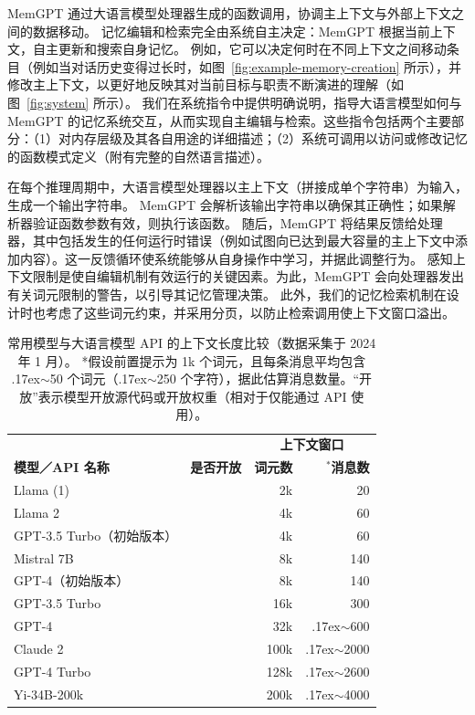 \documentclass[UTF8,fontset=fandol,a4paper,11pt]{ctexart}
\newcommand{\ours}{MemGPT\xspace}
\newcommand{\mytilde}{\raise.17ex\hbox{$\scriptstyle\mathtt{\sim}$}}
\newcommand{\green}[1]{\textcolor{ForestGreen}{#1}}
\newcommand{\red}[1]{\textcolor{red}{#1}}
\newcommand{\cmark}{\green{\ding{51}}}
\newcommand{\xmark}{\red{\ding{55}}}
\begin{document}
\ours 通过大语言模型处理器生成的函数调用，协调主上下文与外部上下文之间的数据移动。
记忆编辑和检索完全由系统自主决定：\ours 根据当前上下文，自主更新和搜索自身记忆。
例如，它可以决定何时在不同上下文之间移动条目（例如当对话历史变得过长时，如图~\ref{fig:example-memory-creation} 所示），并修改主上下文，以更好地反映其对当前目标与职责不断演进的理解（如图~\ref{fig:system} 所示）。
我们在系统指令中提供明确说明，指导大语言模型如何与 \ours 的记忆系统交互，从而实现自主编辑与检索。这些指令包括两个主要部分：（1）对内存层级及其各自用途的详细描述；（2）系统可调用以访问或修改记忆的函数模式定义（附有完整的自然语言描述）。

在每个推理周期中，大语言模型处理器以主上下文（拼接成单个字符串）为输入，生成一个输出字符串。
\ours 会解析该输出字符串以确保其正确性；如果解析器验证函数参数有效，则执行该函数。
随后，\ours 将结果反馈给处理器，其中包括发生的任何运行时错误（例如试图向已达到最大容量的主上下文中添加内容）。这一反馈循环使系统能够从自身操作中学习，并据此调整行为。
感知上下文限制是使自编辑机制有效运行的关键因素。为此，\ours 会向处理器发出有关词元限制的警告，以引导其记忆管理决策。
此外，我们的记忆检索机制在设计时也考虑了这些词元约束，并采用分页，以防止检索调用使上下文窗口溢出。



\begin{table}[t!]
\caption{{
常用模型与大语言模型 API 的上下文长度比较（数据采集于 2024 年 1 月）。
*假设前置提示为 1k 个词元，且每条消息平均包含 \mytilde50 个词元（\mytilde250 个字符），据此估算消息数量。“开放”表示模型开放源代码或开放权重（相对于仅能通过 API 使用）。
}}
\label{context-length-comparison}
\begin{center}
\small
\begin{tabular}{lcrr}
\toprule
\multicolumn{1}{l}{}
&\multicolumn{1}{l}{}
&\multicolumn{2}{c}{\bf 上下文窗口}
\\
\multicolumn{1}{l}{\bf 模型／API 名称}
&\multicolumn{1}{r}{\bf 是否开放}
&\multicolumn{1}{r}{\bf 词元数}
&\multicolumn{1}{r}{\bf $^*$消息数}
\\ \hline \noalign{\smallskip}
Llama (1) & \cmark &2k &20 \\
Llama 2 & \cmark &4k &60\\
GPT-3.5 Turbo（初始版本） & \xmark &4k &60\\
Mistral 7B & \cmark &8k &140\\
GPT-4（初始版本） & \xmark &8k &140\\
GPT-3.5 Turbo & \xmark &16k &300\\
GPT-4 & \xmark &32k &\mytilde600\\
Claude 2 & \xmark &100k&\mytilde2000\\
GPT-4 Turbo & \xmark &128k &\mytilde2600\\
Yi-34B-200k & \cmark &200k &\mytilde4000\\

\end{tabular}
\end{center}
\end{table}
\end{document}
